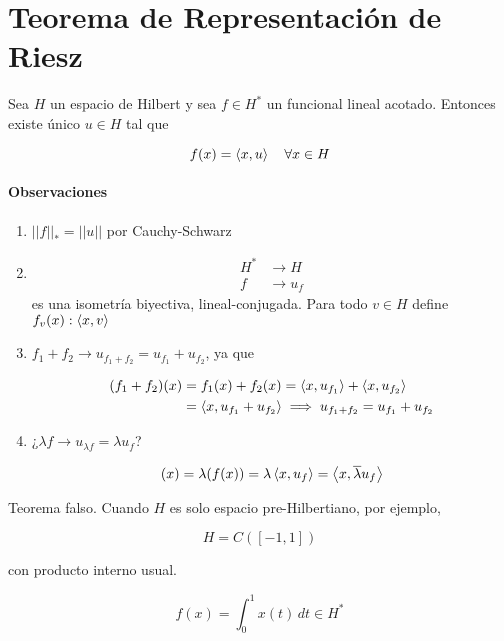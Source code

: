 \section{Teorema de Representación de Riesz}

\begin{ftheorem}
    Sea $H$ un espacio de Hilbert y sea $f\in H^*$ un funcional lineal acotado. Entonces existe único $u\in H$ tal que 

    \[f(x)=\left\langle x,u\right\rangle\quad \forall x\in H\]
\end{ftheorem}

\paragraph*{Observaciones}

\begin{enumerate}
    \item $||f||_*=||u||$ por Cauchy-Schwarz
    \item \begin{align*}
        H^*&\to H\\
        f&\to u_f
    \end{align*}
    es una isometría biyectiva, lineal-conjugada. Para todo $v\in H$ define $f_v(x):\left\langle x,v\right\rangle$
    \item $f_1+f_2\to u_{f_1+f_2}=u_{f_1}+u_{f_2}$, ya que
    
    \begin{align*}
        (f_1+f_2)(x)&=f_1(x)+f_2(x)=\left\langle x,u_{f_1}\right\rangle+\left\langle x,u_{f_2}\right\rangle\\
        &=\left\langle x,u_{f_1}+u_{f_2}\right\rangle\implies u_{f_1+f_2}=u_{f_1}+u_{f_2}
    \end{align*}

    \item ¿$\lambda f\to u_{\lambda f}=\lambda u_f$?
    
    \begin{align*}
        [\lambda f](x)=\lambda (f(x))=\lambda\inn{x,u_f}=\inn{x,\overline{\lambda}u_f}
    \end{align*}
\end{enumerate}

\begin{fnote}
    Teorema falso. Cuando $H$ es solo espacio pre-Hilbertiano, por ejemplo,

    \[H=C([-1,1])\]

    con producto interno usual.

    \[f(x)=\int_0^1 x(t)\,dt\in H^*\]

\end{fnote}

